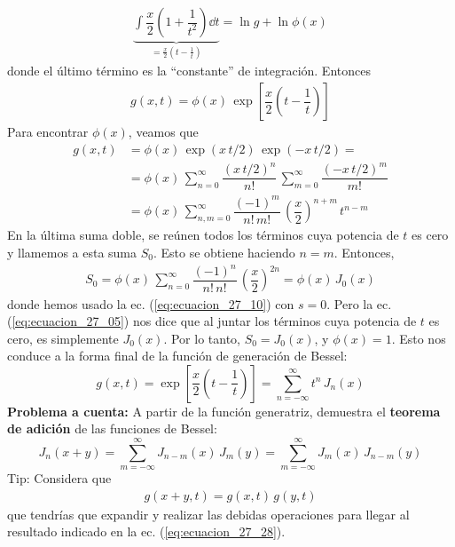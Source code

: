 \begin{align*}
\underbrace{\int \dfrac{x}{2} \left( 1 + \dfrac{1}{t^{2}} \right) \dd{t}}_{=\frac{x}{2} (t - \frac{1}{t})} = \ln g + \ln \phi(x)
\end{align*}
donde el último término es la \enquote{constante} de integración. Entonces
\begin{align*}
g (x, t) = \phi (x) \, \exp \left[ \dfrac{x}{2} \left( t - \dfrac{1}{t} \right) \right]
\end{align*}
Para encontrar $\phi(x)$, veamos que
\begin{align*}
g(x, t) &= \phi (x) \, \exp(x \, t / 2) \, \exp(-x \, t / 2) = \\[1em]
&= \phi (x) \, \sum_{n=0}^{\infty} \dfrac{(x \, t / 2)^{n}}{n!} \, \sum_{m=0}^{\infty} \dfrac{(-x \, t / 2)^{m}}{m!} \\[1em]
&= \phi (x) \, \sum_{n, m=0}^{\infty} \dfrac{(-1)^{m}}{n! \, m!} \, \left( \dfrac{x}{2} \right)^{n+m} \, t^{n-m}
\end{align*}
En la última suma doble, se reúnen todos los términos cuya potencia de $t$ es cero y llamemos a esta suma $S_{0}$. Esto se obtiene haciendo $n = m$. Entonces,
\begin{align*}
S_{0} = \phi (x) \, \sum_{n=0}^{\infty} \dfrac{(-1)^{n}}{n! \, n!} \, \left( \dfrac{x}{2} \right)^{2n} = \phi (x) \, J_{0} (x)
\end{align*}
donde hemos usado la ec. (\ref{eq:ecuacion_27_10}) con $s = 0$. Pero la ec. (\ref{eq:ecuacion_27_05}) nos dice que al juntar los términos cuya potencia de $t$ es cero, es simplemente $J_{0} (x)$. Por lo tanto, $S_{0} = J_{0} (x)$, y $\phi (x) = 1$. Esto nos conduce a la forma final de la función de generación de Bessel:
\begin{equation}
g (x, t) = \exp \left[ \dfrac{x}{2} \left( t - \dfrac{1}{t} \right) \right] = \sum_{n=-\infty}^{\infty} t^{n} \, J_{n} (x)
\label{eq:ecuacion_27_27}
\end{equation}
\textbf{Problema a cuenta: } A partir de la función generatriz, demuestra el \textbf{teorema de adición} de las funciones de Bessel:
\begin{equation}
J_{n} (x + y) = \sum_{m=-\infty}^{\infty} J_{n-m} (x) \, J_{m} (y) = \sum_{m=-\infty}^{\infty} J_{m} (x) \, J_{n-m} (y)
\label{eq:ecuacion_27_28}
\end{equation}
Tip: Considera que
\begin{align*}
g (x + y, t) =  g(x, t) \, g(y, t)
\end{align*}
que tendrías que expandir y realizar las debidas operaciones para llegar al resultado indicado en la ec. (\ref{eq:ecuacion_27_28}).
